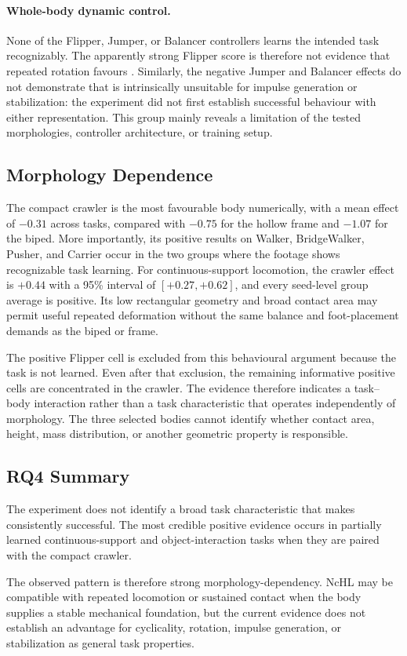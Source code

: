 \paragraph{Whole-body dynamic control.}
None of the Flipper, Jumper, or Balancer controllers learns the intended task recognizably. The apparently strong Flipper score is therefore not evidence that repeated rotation favours \nchl{}. Similarly, the negative Jumper and Balancer effects do not demonstrate that \nchl{} is intrinsically unsuitable for impulse generation or stabilization: the experiment did not first establish successful behaviour with either representation. This group mainly reveals a limitation of the tested morphologies, controller architecture, or training setup.

\subsection{Morphology Dependence}

The compact crawler is the most favourable body numerically, with a mean effect of $-0.31$ across tasks, compared with $-0.75$ for the hollow frame and $-1.07$ for the biped. More importantly, its positive results on Walker, BridgeWalker, Pusher, and Carrier occur in the two groups where the footage shows recognizable task learning. For continuous-support locomotion, the crawler effect is $+0.44$ with a 95\% interval of $[+0.27,+0.62]$, and every seed-level group average is positive. Its low rectangular geometry and broad contact area may permit useful repeated deformation without the same balance and foot-placement demands as the biped or frame.

The positive Flipper cell is excluded from this behavioural argument because the task is not learned. Even after that exclusion, the remaining informative positive cells are concentrated in the crawler. The evidence therefore indicates a task--body interaction rather than a task characteristic that operates independently of morphology. The three selected bodies cannot identify whether contact area, height, mass distribution, or another geometric property is responsible.

\subsection{RQ4 Summary}

The experiment does not identify a broad task characteristic that makes \nchl{} consistently successful. The most credible positive evidence occurs in partially learned continuous-support and object-interaction tasks when they are paired with the compact crawler. 

The observed pattern is therefore strong morphology-dependency. NcHL may be compatible with repeated locomotion or sustained contact when the body supplies a stable mechanical foundation, but the current evidence does not establish an advantage for cyclicality, rotation, impulse generation, or stabilization as general task properties. 
